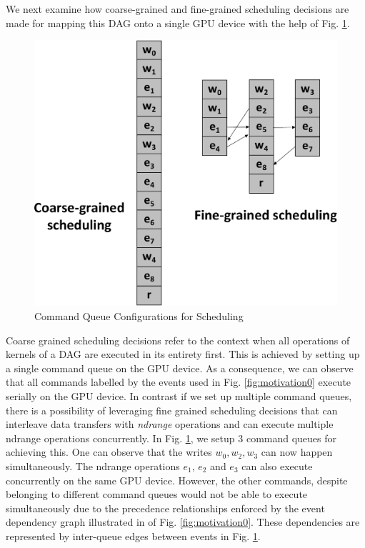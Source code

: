	\par We next examine how coarse-grained and fine-grained scheduling decisions are made for mapping this DAG onto a single GPU device with the help of Fig. \ref{fig:finecoarse}. 
	\begin{figure}[ht]  
		\centering
		\includegraphics[scale=0.35]{Pictures/finecoarse.pdf}
		\caption{Command Queue Configurations for Scheduling \label{fig:finecoarse}}
	\end{figure}
	\par Coarse grained scheduling decisions refer to the context when all operations of kernels of a DAG are executed in its entirety first. This is achieved by setting up a single command queue on the GPU device. As a consequence, we can observe that all commands labelled by the events used in Fig. \ref{fig:motivation0} execute serially on the GPU device. In contrast if we set up multiple command queues, there is a possibility of leveraging fine grained scheduling decisions that can interleave data transfers with \textit{ndrange} operations and can execute multiple ndrange operations concurrently. In Fig. \ref{fig:finecoarse}, we setup 3 command queues for achieving this. One can observe that the writes $w_0,w_2,w_3$ can now happen simultaneously. The ndrange operations $e_1$, $e_2$ and $e_3$ can also execute concurrently on the same GPU device. However, the other commands, despite belonging to different command queues would not be able to execute simultaneously due to the precedence relationships enforced by the event dependency graph illustrated in  of Fig. \ref{fig:motivation0}.  These dependencies are represented by inter-queue edges between events in Fig. \ref{fig:finecoarse}.
